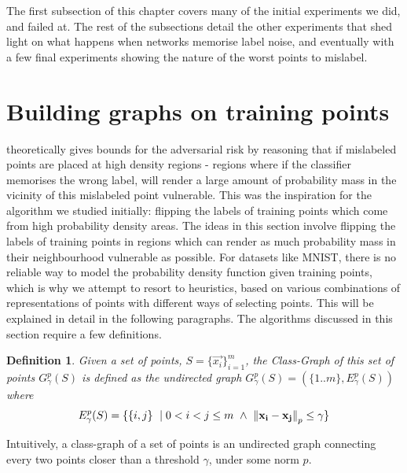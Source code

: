 \documentclass{ociamthesis}
\newtheorem{definition}{Definition}
\begin{document}
The first subsection of this chapter covers many of the initial experiments we
did, and failed at. The rest of the subsections detail the other experiments
that shed light on what happens when networks memorise label noise, and
eventually with a few final experiments showing the nature of the worst points
to mislabel.



\section{Building graphs on training points}

\citet{sanyal2021how} theoretically gives bounds for the adversarial risk by
reasoning that if mislabeled points are placed at high density regions - regions
where if the classifier memorises the wrong label, will render a large amount of
probability mass in the vicinity of this mislabeled point vulnerable. This was
the inspiration for the algorithm we studied initially: flipping the labels of
training points which come from high probability density areas. The ideas in
this section involve flipping the labels of training points in regions which can
render as much probability mass in their neighbourhood vulnerable as possible.
For datasets like MNIST, there is no reliable way to model the probability
density function given training points, which is why we attempt to resort to
heuristics, based on various combinations of representations of points with
different ways of selecting points. This will be explained in detail in the
following paragraphs. The algorithms discussed in this section require a few
definitions.

\begin{definition}
    Given a set of points, $S=\{\vec{x_i}\}_{i=1}^m$, the Class-Graph of this
    set of points $G_\gamma^{p}(S)$ is defined as the undirected graph
    $G_\gamma^{p}(S) = (\{1..m\}, E_\gamma^p(S))$ where
    \begin{equation*}
        E_\gamma^p(S) =
        \{\{i, j\}~\mid 0 < i < j \leq m~\wedge~
        \mathrm{\left\lVert{\mathbf{x_i}}-{\mathbf{x_j}}\right\rVert}_p \leq \gamma \}
    \end{equation*}
    \label{def:class-graph}
\end{definition}
Intuitively, a class-graph of a set of points is an undirected graph connecting
every two points closer than a threshold $\gamma$, under some norm $p$.
\end{document}
